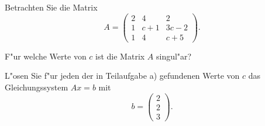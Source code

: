 Betrachten Sie die Matrix
\[
A=\begin{pmatrix}
2&  4&   2\\
1&c+1&3c-2\\
1&  4& c+5
\end{pmatrix}.
\]
\begin{teilaufgaben}
\item F"ur welche Werte von $c$ ist die Matrix $A$ singul"ar?
\item L"osen Sie f"ur jeden der in Teilaufgabe a) gefundenen Werte von $c$ 
das Gleichungssystem $Ax=b$ mit
\[
b=\begin{pmatrix}2\\2\\3\end{pmatrix}.
\]
\end{teilaufgaben}

